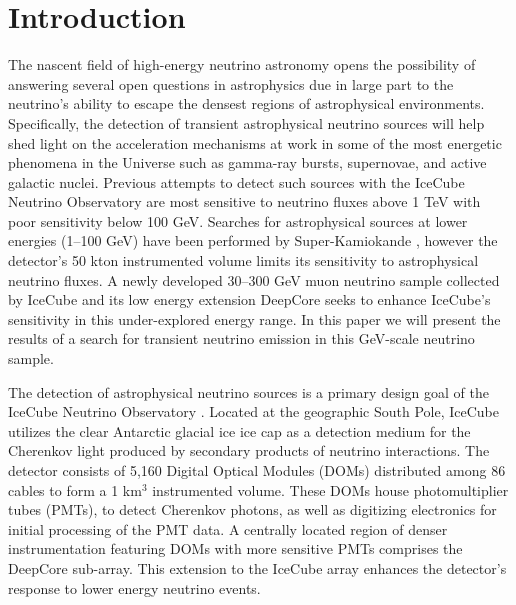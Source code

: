 \documentclass[manuscript]{aastex}
\begin{document}



\section{Introduction}
The nascent field of high-energy neutrino astronomy opens the possibility of answering several open questions in astrophysics due in large part to the neutrino's ability to escape the densest regions of astrophysical environments. Specifically, the detection of transient astrophysical neutrino sources will help shed light on the acceleration mechanisms at work in some of the most energetic phenomena in the Universe such as gamma-ray bursts, supernovae, and active galactic nuclei. Previous attempts to detect such sources with the IceCube Neutrino Observatory \citep{2006APh....26..155I} are most sensitive to neutrino fluxes above 1 TeV with poor sensitivity below 100 GeV. Searches for astrophysical sources at lower energies (1--100 GeV) have been performed by Super-Kamiokande \citep{2009ApJ...704..503T}, however the detector's 50 kton instrumented volume limits its sensitivity to astrophysical neutrino fluxes. A newly developed 30--300 GeV muon neutrino sample collected by IceCube and its low energy extension DeepCore \citep{2012APh....35..615A} seeks to enhance IceCube's sensitivity in this under-explored energy range. In this paper we will present the results of a search for transient neutrino emission in this GeV-scale neutrino sample.

The detection of astrophysical neutrino sources is a primary design goal of the IceCube Neutrino Observatory \citep{2006APh....26..155I}. Located at the geographic South Pole, IceCube utilizes the clear Antarctic glacial ice ice cap as a detection medium for the Cherenkov light produced by secondary products of neutrino interactions. The detector consists of 5,160 Digital Optical Modules (DOMs) distributed among 86 cables to form a 1 km$^3$ instrumented volume. These DOMs house photomultiplier tubes (PMTs), to detect Cherenkov photons, as well as digitizing electronics for initial processing of the PMT data. A centrally located region of denser instrumentation featuring DOMs with more sensitive PMTs comprises the DeepCore sub-array. This extension to the IceCube array enhances the detector's response to lower energy neutrino events.
\end{document}
